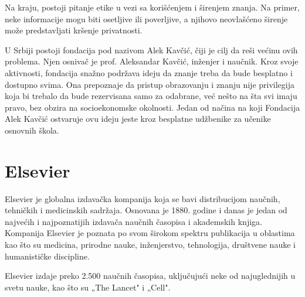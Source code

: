 \documentclass{article}
\begin{document}
Na kraju, postoji pitanje etike u vezi sa korišćenjem i širenjem znanja. Na primer, neke informacije mogu biti osetljive ili poverljive, a njihovo neovlašćeno širenje može predstavljati kršenje privatnosti.

U Srbiji postoji fondacija pod nazivom Alek Kavčić, čiji je cilj da reši većinu ovih problema. Njen osnivač je prof. Aleksandar Kavčić, inženjer i naučnik. Kroz svoje aktivnosti, fondacija snažno podržava ideju da znanje treba da bude besplatno i dostupno svima. Ona prepoznaje da pristup obrazovanju i znanju nije privilegija koja bi trebalo da bude rezervisana samo za odabrane, već nešto na šta svi imaju pravo, bez obzira na socioekonomske okolnosti. Jedan od načina na koji Fondacija Alek Kavčić ostvaruje ovu ideju jeste kroz besplatne udžbenike za učenike osnovnih škola.


\section{Elsevier}

Elsevier je globalna izdavačka kompanija koja se bavi distribucijom naučnih, tehničkih i medicinskih sadržaja. Osnovana je 1880. godine i danas je jedan od najvećih i najpoznatijih izdavača naučnih časopisa i akademskih knjiga. Kompanija Elsevier je poznata po svom širokom spektru publikacija u oblastima kao što su medicina, prirodne nauke, inženjerstvo, tehnologija, društvene nauke i humanističke discipline.

Elsevier izdaje preko 2.500 naučnih časopisa, uključujući neke od najuglednijih u svetu nauke, kao što su „The Lancet" i „Cell".
\end{document}
